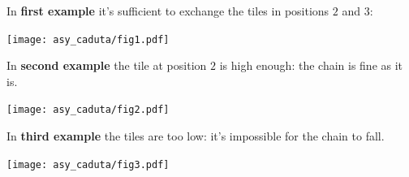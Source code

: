 

\Examples

\begin{example}
%
%
%
\end{example}


\pagebreak
\Explanation

In \textbf{first example} it's sufficient to exchange the tiles in positions $2$ and $3$:

\begin{center}
	\texttt{[image: asy\_caduta/fig1.pdf]}
\end{center}

In \textbf{second example} the tile at position $2$ is high enough: the chain is fine as it is.

\begin{center}
	\texttt{[image: asy\_caduta/fig2.pdf]}
\end{center}

In \textbf{third example} the tiles are too low: it's impossible for the chain to fall.

\begin{center}
	\texttt{[image: asy\_caduta/fig3.pdf]}
\end{center}
